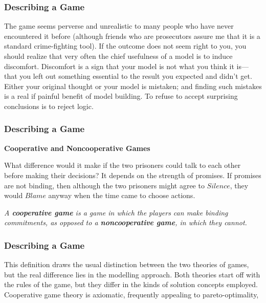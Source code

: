  \begin{frame}[fragile]\frametitle{Describing a Game}
   The  game seems   perverse and unrealistic to many people who have never
encountered it before (although friends who are prosecutors   assure me that it
is a standard crime-fighting tool). If the outcome does not seem right to you,
you should realize that very often the chief usefulness of a model is to induce
discomfort. Discomfort is a sign that your model is not what you think it is---
that you left out something essential to the result you expected and didn't get.
Either your original thought or your model is mistaken; and finding such
mistakes is a real if painful benefit of model building. To refuse  to accept
surprising conclusions  is to reject logic.
\end{frame}


 \begin{frame}[fragile]\frametitle{Describing a Game}
 
  {\bf Cooperative and Noncooperative Games}

  What difference would it make if the two prisoners could talk to each
other before making their decisions?  It depends on the strength of promises. If
promises are not binding, then although the two prisoners might agree to
$Silence$, they would $Blame$ anyway when the time came to choose actions.

 
{\it A {\bf cooperative game} is a game in which the players can make binding
commitments, as opposed to a {\bf noncooperative game}, in which they cannot.}
\end{frame}


 \begin{frame}[fragile]\frametitle{Describing a Game}
         This definition draws the usual distinction between the two theories of
games, but the real difference lies in the modelling approach. Both theories
start off with the rules of the game, but they differ in the kinds of solution
concepts employed. Cooperative game theory is axiomatic, frequently appealing to
pareto-optimality,


\end{frame}

